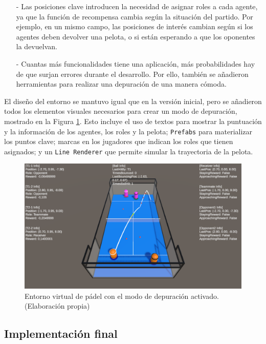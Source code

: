 \begin{enumerate}
    \item[-] Las posiciones clave introducen la necesidad de asignar roles a cada agente, ya que la función de recompensa cambia según la situación del partido. Por ejemplo, en un mismo campo, las posiciones de interés cambian según si los agentes deben devolver una pelota, o si están esperando a que los oponentes la devuelvan.
    \item[-] Cuantas más funcionalidades tiene una aplicación, más probabilidades hay de que surjan errores durante el desarrollo. Por ello, también se añadieron herramientas para realizar una depuración de una manera cómoda.
\end{enumerate}

El diseño del entorno se mantuvo igual que en la versión inicial, pero se añadieron todos los elementos visuales necesarios para crear un modo de depuración, mostrado en la Figura \ref{fig:pista-padel-debug}.  Esto incluye el uso de textos para mostrar la puntuación y la información de los agentes, los roles y la pelota; \texttt{Prefabs} para materializar los puntos clave; marcas en los jugadores que indican los roles que tienen asignados; y un \texttt{Line Renderer} que permite simular la trayectoria de la pelota.

\begin{figure}[H]
    \centering
    \includegraphics[width=13cm]{figures/pista-padel-debug.png}
    \caption[Entorno virtual de pádel con el modo de depuración activado]{Entorno virtual de pádel con el modo de depuración activado. (Elaboración propia)}
    \label{fig:pista-padel-debug}
\end{figure}

\subsection{Implementación final}\label{section:implementacion-final}

